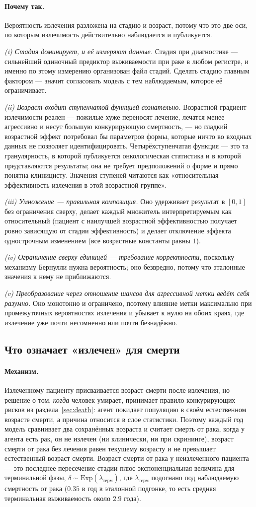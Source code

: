 \documentclass[12pt,a4paper]{article}
\newcommand{\mech}[1]{\paragraph{Механизм.} #1}
\newcommand{\why}[1]{\paragraph{Почему так.} #1}
\begin{document}
\why{Вероятность излечения разложена на стадию и возраст, потому что это две оси, по которым излечимость
действительно наблюдается и публикуется.

\emph{(i) Стадия доминирует, и её измеряют данные.} Стадия при диагностике --- сильнейший одиночный
предиктор выживаемости при раке в любом регистре, и именно по этому измерению организован файл стадий.
Сделать стадию главным фактором --- значит согласовать модель с тем наблюдаемым, которое её ограничивает.

\emph{(ii) Возраст входит ступенчатой функцией сознательно.} Возрастной градиент излечимости реален ---
пожилые хуже переносят лечение, лечатся менее агрессивно и несут большую конкурирующую смертность, --- но
гладкий возрастной эффект потребовал бы параметров формы, которые ничто во входных данных не позволяет
идентифицировать. Четырёхступенчатая функция --- это та гранулярность, в которой публикуется
онкологическая статистика и в которой представляются результаты; она не требует предположений о форме и
прямо понятна клиницисту. Значения ступеней читаются как «относительная эффективность излечения в этой
возрастной группе».

\emph{(iii) Умножение --- правильная композиция.} Оно удерживает результат в $[0,1]$ без ограничения сверху,
делает каждый множитель интерпретируемым как относительный (пациент с наилучшей возрастной эффективностью
получает ровно зависящую от стадии эффективность) и делает отключение эффекта однострочным изменением (все
возрастные константы равны $1$).

\emph{(iv) Ограничение сверху единицей --- требование корректности,} поскольку механизму Бернулли нужна
вероятность; оно безвредно, потому что эталонные значения к нему не приближаются.

\emph{(v) Преобразование через отношение шансов для агрессивной метки ведёт себя разумно.} Оно монотонно и
ограничено, поэтому влияние метки максимально при промежуточных вероятностях излечения и убывает к нулю на
обоих краях, где излечение уже почти несомненно или почти безнадёжно.}

\subsection{Что означает «излечен» для смерти}

\mech{Излеченному пациенту присваивается возраст смерти после излечения, но решение о том, \emph{когда}
человек умирает, принимает правило конкурирующих рисков из раздела~\ref{sec:death}: агент покидает
популяцию в своём естественном возрасте смерти, а причина относится в слое статистики. Поэтому каждый год
модель сравнивает два сохранённых возраста и считает смерть от рака, когда у агента есть рак, он не излечен
(ни клинически, ни при скрининге), возраст смерти от рака без лечения равен текущему возрасту и не
превышает естественный возраст смерти. Возраст смерти от рака у неизлеченного пациента --- это последнее
пересечение стадии плюс экспоненциальная величина для терминальной фазы,
$\delta \sim \mathrm{Exp}(\lambda_{\text{терм}})$, где $\lambda_{\text{терм}}$ подогнано под наблюдаемую
смертность от рака ($0.35$ в год в эталонной подгонке, то есть средняя терминальная выживаемость около
$2.9$ года).}
\end{document}
